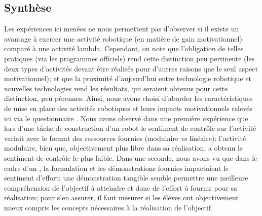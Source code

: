     \subsection{Synthèse}
        Les expériences ici menées ne nous permettent pas d'observer si il existe un avantage à exercer une activité robotique (en matière de gain motivationnel) comparé à une activité lambda. Cependant, on note que \Li l'obligation de telles pratiques (via les programmes officiels) rend cette distinction peu pertinente (les deux types d'activités devant être réalisés pour d'autres raisons que le seul aspect motivationnel); et que \ii la proximité d'aujourd'hui entre technologie robotique et nouvelles technologies rend les résultats, qui seraient obtenus pour cette distinction, peu pérennes.
        Ainsi, nous avons choisi d'aborder les caractéristiques de mise en place des activités robotiques et leurs impacts motivationnels relevés ici via le questionnaire . Nous avons observé dans une première expérience que lors d'une tâche de construction d'un robot le sentiment de contrôle sur l'activité variait avec le format des ressources fournies (\eg modulaire \textit{vs} linéaire): l'activité modulaire, bien que, objectivement plus libre dans sa réalisation, a obtenu le sentiment de contrôle le plus faible. Dans une seconde, nous avons vu que dans le cadre d'un , la formulation et les démonstrations fournies impactaient le sentiment d'effort: une démonstration tangible semble permettre une meilleure compréhension de l'objectif à atteindre et donc de l'effort à fournir pour sa réalisation; pour s'en assurer, il faut mesurer si les élèves ont objectivement mieux compris les concepts nécessaires à la réalisation de l'objectif. 